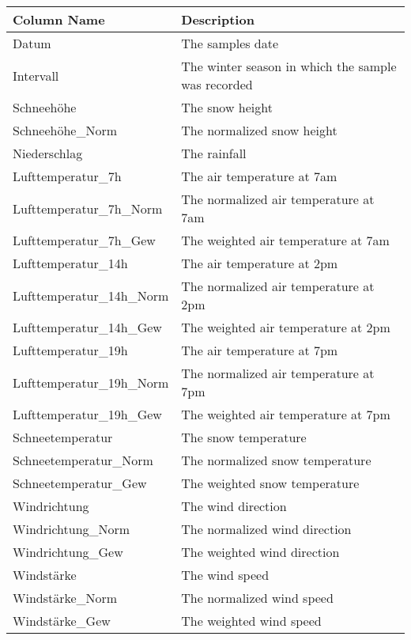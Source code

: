\documentclass[../masterarbeit.tex]{subfiles}
\begin{document}
\begin{table}
    \centering
    \begin{tabular}{|l|l|}
    \hline
        Column Name & Description \\ \hline
        Datum & The samples date \\ \hline
        Intervall & The winter season in which the sample was recorded \\ \hline
        Schneehöhe & The snow height \\ \hline
        Schneehöhe\_Norm & The normalized snow height \\ \hline
        Niederschlag & The rainfall \\ \hline
        Lufttemperatur\_7h & The air temperature at 7am \\ \hline
        Lufttemperatur\_7h\_Norm & The normalized air temperature at 7am \\ \hline
        Lufttemperatur\_7h\_Gew & The weighted air temperature at 7am \\ \hline
        Lufttemperatur\_14h & The air temperature at 2pm \\ \hline
        Lufttemperatur\_14h\_Norm & The normalized air temperature at 2pm \\ \hline
        Lufttemperatur\_14h\_Gew & The weighted air temperature at 2pm \\ \hline
        Lufttemperatur\_19h & The air temperature at 7pm \\ \hline
        Lufttemperatur\_19h\_Norm & The normalized air temperature at 7pm \\ \hline
        Lufttemperatur\_19h\_Gew & The weighted air temperature at 7pm \\ \hline
        Schneetemperatur & The snow temperature \\ \hline
        Schneetemperatur\_Norm & The normalized snow temperature \\ \hline
        Schneetemperatur\_Gew & The weighted snow temperature \\ \hline
        Windrichtung & The wind direction \\ \hline
        Windrichtung\_Norm & The normalized wind direction \\ \hline
        Windrichtung\_Gew & The weighted wind direction \\ \hline
        Windstärke & The wind speed \\ \hline
        Windstärke\_Norm & The normalized wind speed \\ \hline
        Windstärke\_Gew & The weighted wind speed \\ \hline

\end{tabular}
\end{table}
\end{document}
